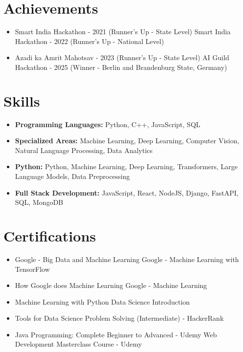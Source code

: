 \documentclass[a4paper,10pt]{article}
\begin{document}
\section*{Achievements}
\begin{itemize}
\item Smart India Hackathon - 2021 (Runner's Up - State Level) \hfill Smart India Hackathon - 2022 (Runner's Up - National Level)
\item Azadi ka Amrit Mahotsav - 2023 (Runner's Up - State Level) \hfill AI Guild Hackathon - 2025 (Winner - Berlin and Brandenburg State, Germany)
\end{itemize}

\section*{Skills}
\begin{itemize}
  \item \textbf{Programming Languages:} Python, C++, JavaScript, SQL
  \item \textbf{Specialized Areas:} Machine Learning, Deep Learning, Computer Vision, Natural Language Processing, Data Analytics
  \item \textbf{Python:} Python, Machine Learning, Deep Learning, Transformers, Large Language Models, Data Preprocessing
  \item \textbf{Full Stack Development:} JavaScript, React, NodeJS, Django, FastAPI, SQL, MongoDB
\end{itemize}

\section*{Certifications}
\begin{itemize}
\item Google - Big Data and Machine Learning \hfill Google - Machine Learning with TensorFlow
\item How Google does Machine Learning \hfill Google - Machine Learning
\item Machine Learning with Python \hfill Data Science Introduction
\item Tools for Data Science \hfill Problem Solving (Intermediate) - HackerRank
\item Java Programming: Complete Beginner to Advanced - Udemy \hfill Web Development Masterclass Course - Udemy
\end{itemize}
\end{document}
